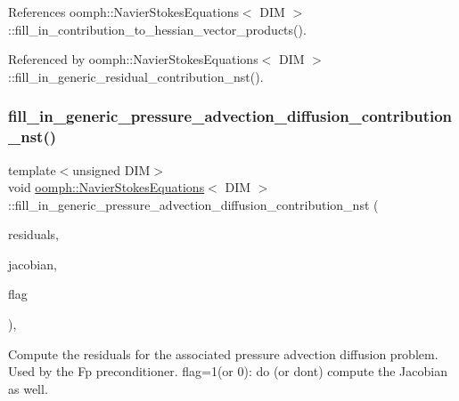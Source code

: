 References oomph\+::\+Navier\+Stokes\+Equations$<$ D\+I\+M $>$\+::fill\+\_\+in\+\_\+contribution\+\_\+to\+\_\+hessian\+\_\+vector\+\_\+products().



Referenced by oomph\+::\+Navier\+Stokes\+Equations$<$ D\+I\+M $>$\+::fill\+\_\+in\+\_\+generic\+\_\+residual\+\_\+contribution\+\_\+nst().

\mbox{\label{classoomph_1_1NavierStokesEquations_a50d5b099e2f2c16028682ee48571f8a4}} 
\subsubsection{\texorpdfstring{fill\+\_\+in\+\_\+generic\+\_\+pressure\+\_\+advection\+\_\+diffusion\+\_\+contribution\+\_\+nst()}{fill\_in\_generic\_pressure\_advection\_diffusion\_contribution\_nst()}}
{\footnotesize\ttfamily template$<$unsigned D\+IM$>$ \\
void \hyperlink{classoomph_1_1NavierStokesEquations}{oomph\+::\+Navier\+Stokes\+Equations}$<$ D\+IM $>$\+::fill\+\_\+in\+\_\+generic\+\_\+pressure\+\_\+advection\+\_\+diffusion\+\_\+contribution\+\_\+nst (\begin{DoxyParamCaption}\item[{\hyperlink{classoomph_1_1Vector}{Vector}$<$ double $>$ \&}]{residuals,  }\item[{\hyperlink{classoomph_1_1DenseMatrix}{Dense\+Matrix}$<$ double $>$ \&}]{jacobian,  }\item[{unsigned}]{flag }\end{DoxyParamCaption})\hspace{0.3cm}{\ttfamily [protected]}, {\ttfamily [virtual]}}



Compute the residuals for the associated pressure advection diffusion problem. Used by the Fp preconditioner. flag=1(or 0)\+: do (or don\textquotesingle{}t) compute the Jacobian as well. 

